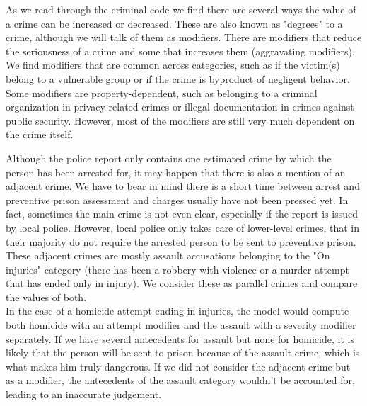 \documentclass{article}
\begin{document}
As we read through the criminal code we find there are several ways the value of a crime can be increased or decreased. These are also known as "degrees" to a crime, although we will talk of them as modifiers. There are modifiers that reduce the seriousness of a crime and some that increases them (aggravating modifiers). %
We find modifiers that are common across categories, such as if the victim(s) belong to a vulnerable group or if the crime is byproduct of negligent behavior. Some modifiers are property-dependent, such as belonging to a criminal organization in privacy-related crimes or illegal documentation in crimes against public security. However, most of the modifiers are still very much dependent on the crime itself.

Although the police report only contains one estimated crime by which the person has been arrested for, it may happen that there is also a mention of an adjacent crime. We have to bear in mind there is a short time between arrest and preventive prison assessment and charges usually have not been pressed yet. In fact, sometimes the main crime is not even clear, especially if the report is issued by local police. However, local police only takes care of lower-level crimes, that in their majority do not require the arrested person to be sent to preventive prison. \\
These adjacent crimes are mostly assault accusations belonging to the "On injuries" category (there has been a robbery with violence or a murder attempt that has ended only in injury). We consider these as parallel crimes and compare the values of both. \\
In the case of a homicide attempt ending in injuries, the model would compute both homicide with an attempt modifier and the assault with a severity modifier separately. If we have several antecedents for assault but none for homicide, it is likely that the person will be sent to prison because of the assault crime, which is what makes him truly dangerous. If we did not consider the adjacent crime but as a modifier, the antecedents of the assault category wouldn't be accounted for, leading to an inaccurate judgement.
\end{document}
